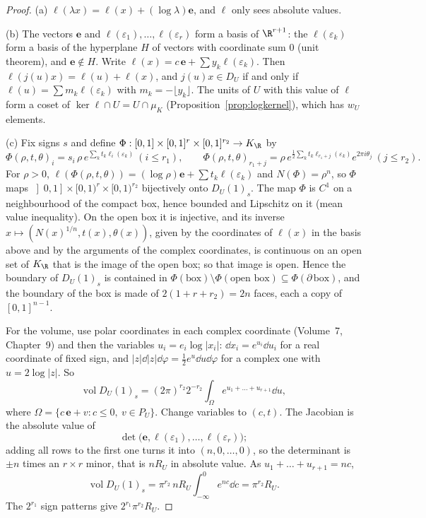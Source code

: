 \begin{proof}
(a) $\ell(\lambda x)=\ell(x)+(\log\lambda)\mathbf e$, and $\ell$ only sees absolute values.

(b) The vectors $\mathbf e$ and $\ell(\varepsilon_1),\dots,\ell(\varepsilon_r)$ form a basis of $\R^{r+1}$: the $\ell(\varepsilon_k)$ form a basis of
the hyperplane $H$ of vectors with coordinate sum $0$ (unit theorem), and $\mathbf e\notin H$. Write $\ell(x)=c\,\mathbf e+\sum
y_k\ell(\varepsilon_k)$. Then $\ell(j(u)x)=\ell(u)+\ell(x)$, and $j(u)x\in D_U$ if and only if $\ell(u)=\sum m_k\ell(\varepsilon_k)$ with
$m_k=-\lfloor y_k\rfloor$. The units of $U$ with this value of $\ell$ form a coset of $\ker\ell\cap U=U\cap\mu_K$
(Proposition~\ref{prop:logkernel}), which has $w_U$ elements.

(c) Fix signs $s$ and define $\Phi:[0,1]\times[0,1]^r\times[0,1]^{r_2}\to K_\R$ by
\[
\Phi(\rho,t,\theta)_i=s_i\,\rho\,e^{\sum_kt_k\ell_i(\varepsilon_k)}\ (i\le r_1),\qquad
\Phi(\rho,t,\theta)_{r_1+j}=\rho\,e^{\frac12\sum_kt_k\ell_{r_1+j}(\varepsilon_k)}e^{2\pi i\theta_j}\ (j\le r_2).
\]
For $\rho>0$, $\ell(\Phi(\rho,t,\theta))=(\log\rho)\mathbf e+\sum t_k\ell(\varepsilon_k)$ and $N(\Phi)=\rho^n$, so $\Phi$ maps
$\left]0,1\right]\times[0,1)^r\times[0,1)^{r_2}$ bijectively onto $D_U(1)_s$. The map $\Phi$ is $C^1$ on a neighbourhood of the compact box,
hence bounded and Lipschitz on it (mean value inequality). On the open box it is injective, and its inverse $x\mapsto
(N(x)^{1/n},t(x),\theta(x))$, given by the coordinates of $\ell(x)$ in the basis above and by the arguments of the complex
coordinates, is continuous on an open set of $K_\R$ that is the image of the open box; so that image is open. Hence the boundary of
$D_U(1)_s$ is contained in $\Phi(\text{box})\setminus\Phi(\text{open box})\subseteq\Phi(\partial\,\text{box})$, and the boundary of the box is
made of $2(1+r+r_2)=2n$ faces, each a copy of $[0,1]^{n-1}$.

For the volume, use polar coordinates in each complex coordinate (Volume~7, Chapter~9) and then the variables $u_i=e_i\log|x_i|$:
$\dd x_i=e^{u_i}\dd u_i$ for a real coordinate of fixed sign, and $|z|\dd|z|\dd\varphi=\frac12e^{u}\dd u\dd\varphi$ for a complex one
with $u=2\log|z|$. So
\[
\operatorname{vol}D_U(1)_s=(2\pi)^{r_2}2^{-r_2}\int_\Omega e^{u_1+\dots+u_{r+1}}\dd u,
\]
where $\Omega=\{c\,\mathbf e+v:c\le0,\ v\in P_U\}$.
Change variables to $(c,t)$. The Jacobian is the absolute value of
\[
\det\bigl(\mathbf e,\ell(\varepsilon_1),\dots,\ell(\varepsilon_r)\bigr);
\]
adding all rows to the first one turns it into $(n,0,\dots,0)$, so the determinant is $\pm n$ times an $r\times r$ minor, that is
$nR_U$ in absolute value. As $u_1+\dots+u_{r+1}=nc$,
\[
\operatorname{vol}D_U(1)_s=\pi^{r_2}\,nR_U\int_{-\infty}^0e^{nc}\dd c=\pi^{r_2}R_U.
\]
The $2^{r_1}$ sign patterns give $2^{r_1}\pi^{r_2}R_U$.
\end{proof}

